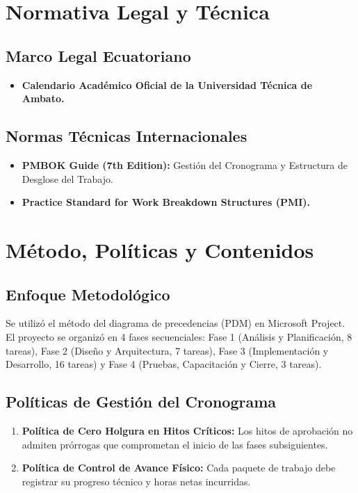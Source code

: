 \documentclass[12pt,a4paper]{article}
\begin{document}
\section{Normativa Legal y Técnica}
\subsection{Marco Legal Ecuatoriano}
\begin{itemize}[leftmargin=1.5em, itemsep=2pt]
    \item \textbf{Calendario Académico Oficial de la Universidad Técnica de Ambato.}
\end{itemize}
\subsection{Normas Técnicas Internacionales}
\begin{itemize}[leftmargin=1.5em, itemsep=2pt]
    \item \textbf{PMBOK Guide (7th Edition):} Gestión del Cronograma y Estructura de Desglose del Trabajo.
    \item \textbf{Practice Standard for Work Breakdown Structures (PMI).}
\end{itemize}

\section{Método, Políticas y Contenidos}
\subsection{Enfoque Metodológico}
Se utilizó el método del diagrama de precedencias (PDM) en Microsoft Project. El proyecto se organizó en 4 fases secuenciales: Fase 1 (Análisis y Planificación, 8 tareas), Fase 2 (Diseño y Arquitectura, 7 tareas), Fase 3 (Implementación y Desarrollo, 16 tareas) y Fase 4 (Pruebas, Capacitación y Cierre, 3 tareas).

\subsection{Políticas de Gestión del Cronograma}
\begin{enumerate}[leftmargin=1.5em, itemsep=2pt]
    \item \textbf{Política de Cero Holgura en Hitos Críticos:} Los hitos de aprobación no admiten prórrogas que comprometan el inicio de las fases subsiguientes.
    \item \textbf{Política de Control de Avance Físico:} Cada paquete de trabajo debe registrar su progreso técnico y horas netas incurridas.
\end{enumerate}
\end{document}
